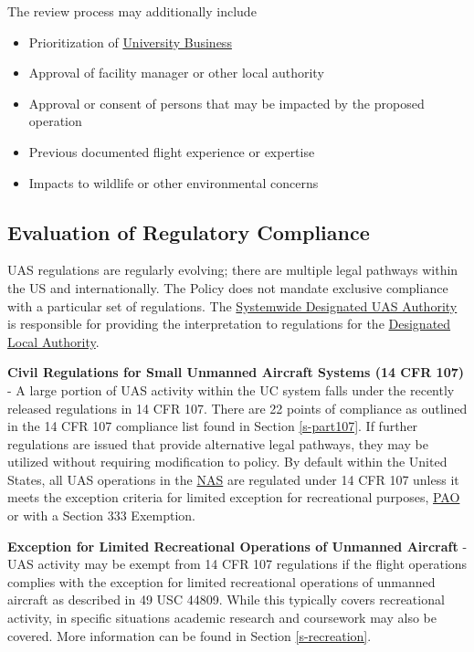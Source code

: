 \documentclass[
]{book}
\providecommand{\tightlist}{%
  \setlength{\itemsep}{0pt}\setlength{\parskip}{0pt}}
\begin{document}
The review process may additionally include

\begin{itemize}
\tightlist
\item
  Prioritization of \protect\hyperlink{UB}{University Business}
\item
  Approval of facility manager or other local authority
\item
  Approval or consent of persons that may be impacted by the proposed operation
\item
  Previous documented flight experience or expertise
\item
  Impacts to wildlife or other environmental concerns
\end{itemize}

\hypertarget{ss-regcomp}{%
\subsection{Evaluation of Regulatory Compliance}\label{ss-regcomp}}

UAS regulations are regularly evolving; there are multiple legal pathways within the US and internationally. The Policy does not mandate exclusive compliance with a particular set of regulations. The \protect\hyperlink{SDA}{Systemwide Designated UAS Authority} is responsible for providing the interpretation to regulations for the \protect\hyperlink{DLA}{Designated Local Authority}.

\textbf{Civil Regulations for Small Unmanned Aircraft Systems (14 CFR 107)} - A large portion of UAS activity within the UC system falls under the recently released regulations in 14 CFR 107. There are 22 points of compliance as outlined in the 14 CFR 107 compliance list found in Section \ref{s-part107}. If further regulations are issued that provide alternative legal pathways, they may be utilized without requiring modification to policy. By default within the United States, all UAS operations in the \protect\hyperlink{NAS}{NAS} are regulated under 14 CFR 107 unless it meets the exception criteria for limited exception for recreational purposes, \protect\hyperlink{PAO}{PAO} or with a Section 333 Exemption.

\textbf{Exception for Limited Recreational Operations of Unmanned Aircraft} - UAS activity may be exempt from 14 CFR 107 regulations if the flight operations complies with the exception for limited recreational operations of unmanned aircraft as described in 49 USC 44809. While this typically covers recreational activity, in specific situations academic research and coursework may also be covered. More information can be found in Section \ref{s-recreation}.
\end{document}
